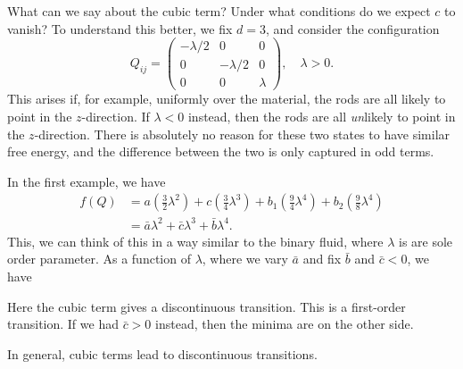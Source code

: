 \documentclass[a4paper]{article}
\begin{document}
What can we say about the cubic term? Under what conditions do we expect $c$ to vanish? To understand this better, we fix $d = 3$, and consider the configuration
\[
  Q_{ij} =
  \begin{pmatrix}
    -\lambda/2 & 0 & 0\\
    0 & -\lambda/2 & 0\\
    0 & 0 & \lambda
  \end{pmatrix},\quad \lambda > 0.
\]
This arises if, for example, uniformly over the material, the rods are all likely to point in the $z$-direction. If $\lambda < 0$ instead, then the rods are all \emph{un}likely to point in the $z$-direction. There is absolutely no reason for these two states to have similar free energy, and the difference between the two is only captured in odd terms.

In the first example, we have
\begin{align*}
  f(Q) &= a \left(\frac{3}{2} \lambda^2\right) + c \left(\frac{3}{4} \lambda^3\right) + b_1\left(\frac{9}{4} \lambda^4\right) + b_2 \left(\frac{9}{8} \lambda^4\right)\\
  &= \bar{a} \lambda^2 + \bar{c} \lambda^3 + \bar{b}\lambda^4.
\end{align*}
This, we can think of this in a way similar to the binary fluid, where $\lambda$ is are sole order parameter. As a function of $\lambda$, where we vary $\bar{a}$ and fix $\bar{b}$ and $\bar{c} < 0$, we have
\begin{center}
\end{center}
Here the cubic term gives a discontinuous transition. This is a first-order transition. If we had $\bar{c} > 0$ instead, then the minima are on the other side.

In general, cubic terms lead to discontinuous transitions.
\end{document}

